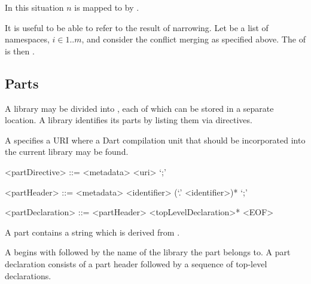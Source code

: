 \documentclass[makeidx]{article}
\begin{document}
{\begin{itemize}
  In this situation $n$ is mapped to \ConflictValue{}
  by .
\end{itemize}


\LMHash{}%
It is useful to be able to refer to the result of narrowing.
Let  be a list of namespaces, $i \in 1 .. m$,
and consider the conflict merging as specified above.
The
of  is then .


\subsection{Parts}

\LMHash{}%
A library may be divided into ,
each of which can be stored in a separate location.
A library identifies its parts by listing them via \PART{} directives.

\LMHash{}%
A  specifies a URI where
a Dart compilation unit that should be incorporated into the current library
may be found.

\begin{grammar}
<partDirective> ::= <metadata> \PART{} <uri> `;'

<partHeader> ::= <metadata> \PART{} \OF{} <identifier> (`.' <identifier>)* `;'

<partDeclaration> ::= <partHeader> <topLevelDeclaration>* <EOF>
\end{grammar}

\LMHash{}%
A part contains a string which is derived from .


\LMHash{}%
A  begins with \PART{} \OF{} followed by
the name of the library the part belongs to.
A part declaration consists of a part header followed by
a sequence of top-level declarations.

}
\end{document}
